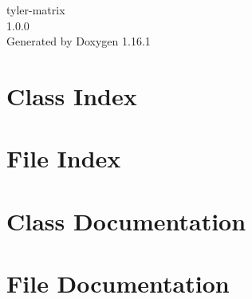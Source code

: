 \documentclass[twoside]{book}
\newcommand{\+}{\discretionary{\mbox{\scriptsize$\hookleftarrow$}}{}{}}
\newcommand{\clearemptydoublepage}{%
    \newpage{\pagestyle{empty}\cleardoublepage}%
  }
\begin{document}
  \raggedbottom
    \hypersetup{pageanchor=false,
                bookmarksnumbered=true,
                pdfencoding=unicode
               }
  \begin{titlepage}
  \vspace*{7cm}
  \begin{center}%
  {\Large tyler-\/matrix}\\
  [1ex]\large 1.\+0.\+0 \\
  \vspace*{1cm}
  {\large Generated by Doxygen 1.16.1}\\
  \end{center}
  \end{titlepage}
  \clearemptydoublepage
  \tableofcontents
  \clearemptydoublepage
  \hypersetup{pageanchor=true}
\chapter{Class Index}

\chapter{File Index}

\chapter{Class Documentation}

\chapter{File Documentation}


  \backmatter
  \newpage
  \clearemptydoublepage
  \printindex
\end{document}
